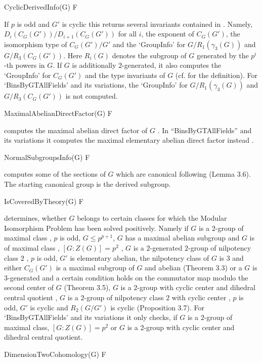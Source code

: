 \> CyclicDerivedInfo(G) F

If $p$ is odd and $G'$ is cyclic this returns several invariants contained in \cite{GLdRS22} \cite{GLdR23}.
Namely, $D_i(C_G(G'))/D_{i+1}(C_G(G'))$ for all $i$, the exponent of $C_G(G')$, the isomorphism
type of $C_G(G')/G'$ and the `GroupInfo' for $G/R_1(\gamma_3(G))$ and $G/R_3(C_G(G'))$.
Here $R_i(G)$ denotes the subgroup of $G$ generated by the $p^i$-th powers in $G$.
If $G$ is additionally $2$-generated, it also computes the `GroupInfo' for $C_G(G')$ and the
type invariants of $G$ (cf. \cite{GLdRS22} for the definition). 
For `BinsByGTAllFields' and its variations, the `GroupInfo' for  $G/R_1(\gamma_3(G))$
 and $G/R_3(C_G(G'))$ is not computed.
 
\> MaximalAbelianDirectFactor(G) F

computes the maximal abelian direct factor of $G$ \cite{GL24}. In ``BinsByGTAllFields'' and
its variations it computes the maximal elementary abelian direct factor instead \cite{MSS23}.

\> NormalSubgroupsInfo(G) F

computes some of the sections of $G$ which are canonical following \cite{GL24}(Lemma 3.6). The starting canonical group is the derived subgroup.

\> IsCoveredByTheory(G) F

determines, whether $G$ belongs to certain classes for which the Modular Isomorphism
Problem has been solved positively. Namely if $G$ is a $2$-group of maximal class \cite{Bag92},
$p$ is odd, $G \leq p^{p+1}$, $G$ has a maximal abelian subgroup and $G$ is of maximal class \cite{BC88},
$[G:Z(G)] = p^2$ \cite{Dre89}, $G$ is a $2$-generated $2$-group of nilpotency class $2$ \cite{BdR21},
$p$ is odd, $G'$ is elementary abelian, the nilpotency class of $G$ is $3$ and either 
$C_G(G')$ is a maximal subgroup of $G$ and abelian \cite{MS22}(Theorem 3.3) or a $G$ is
$3$-generated and a certain condition holds on the commutator map modulo the second center of $G$
\cite{MS22}(Theorem 3.5), $G$ is a $2$-group with cyclic center and dihedral central
quotient \cite{MSS23}, $G$ is a $2$-group of nilpotency class $2$ with cyclic center \cite{GLM24},
$p$ is odd, $G'$ is cyclic and $R_2(G/G')$ is cyclic \cite{GLdR23}(Proposition 3.7). 
For `BinsByGTAllFields' and its variations it only checks, if $G$ is a $2$-group of
maximal class, $[G:Z(G)] = p^2$ or $G$ is a $2$-group with cyclic center and dihedral central
quotient.

\> DimensionTwoCohomology(G) F

